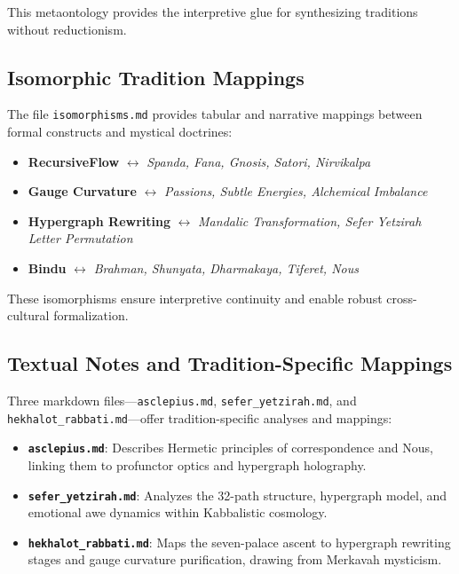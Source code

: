 \documentclass[12pt]{article}
\theoremstyle{plain}
\begin{document}
This metaontology provides the interpretive glue for synthesizing traditions without reductionism.

\subsection{Isomorphic Tradition Mappings}

The file \texttt{isomorphisms.md} provides tabular and narrative mappings between formal constructs and mystical doctrines:

\begin{itemize}
  \item \textbf{RecursiveFlow} $\leftrightarrow$ \textit{Spanda, Fana, Gnosis, Satori, Nirvikalpa}
  \item \textbf{Gauge Curvature} $\leftrightarrow$ \textit{Passions, Subtle Energies, Alchemical Imbalance}
  \item \textbf{Hypergraph Rewriting} $\leftrightarrow$ \textit{Mandalic Transformation, Sefer Yetzirah Letter Permutation}
  \item \textbf{Bindu} $\leftrightarrow$ \textit{Brahman, Shunyata, Dharmakaya, Tiferet, Nous}
\end{itemize}

These isomorphisms ensure interpretive continuity and enable robust cross-cultural formalization.

\subsection{Textual Notes and Tradition-Specific Mappings}

Three markdown files—\texttt{asclepius.md}, \texttt{sefer\_yetzirah.md}, and \texttt{hekhalot\_rabbati.md}—offer tradition-specific analyses and mappings:

\begin{itemize}
  \item \textbf{\texttt{asclepius.md}}: Describes Hermetic principles of correspondence and Nous, linking them to profunctor optics and hypergraph holography.
  \item \textbf{\texttt{sefer\_yetzirah.md}}: Analyzes the 32-path structure, hypergraph model, and emotional awe dynamics within Kabbalistic cosmology.
  \item \textbf{\texttt{hekhalot\_rabbati.md}}: Maps the seven-palace ascent to hypergraph rewriting stages and gauge curvature purification, drawing from Merkavah mysticism.
\end{itemize}
\end{document}
